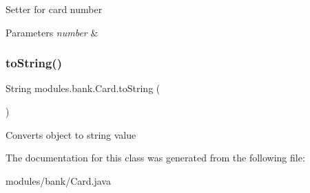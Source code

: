 Setter for card number 
\begin{DoxyParams}{Parameters}
{\em number} & \\
\hline
\end{DoxyParams}
\mbox{\label{classmodules_1_1bank_1_1_card_aad416f3b110c7e08f3294b1b0cfd58d2}} 
\subsubsection{\texorpdfstring{to\+String()}{toString()}}
{\footnotesize\ttfamily String modules.\+bank.\+Card.\+to\+String (\begin{DoxyParamCaption}{ }\end{DoxyParamCaption})\hspace{0.3cm}{\ttfamily [inline]}}

Converts object to string value 

The documentation for this class was generated from the following file\+:\begin{DoxyCompactItemize}
\item 
modules/bank/Card.\+java\end{DoxyCompactItemize}
